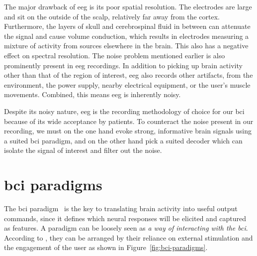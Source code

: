 The major drawback of \ac{eeg} is its poor spatial resolution.
The electrodes are large and sit on the outside of the scalp, relatively far
away from the cortex.
Furthermore, the layers of skull and cerebrospinal fluid in between can
attenuate the signal and cause volume conduction, which results in electrodes
measuring a mixture of activity from sources elsewhere in the brain.
This also has a negative effect on spectral resolution.
The noise problem mentioned earlier is also prominently present in \ac{eeg}
recordings.
In addition to picking up brain activity other than that of the region of
interest, \ac{eeg} also records other artifacts, from the environment, the power
supply, nearby electrical equipment, or the user's muscle movements.
Combined, this means \ac{eeg} is inherently noisy.

Despite its noisy nature, \ac{eeg} is the recording methodology of choice for
our \ac{bci} because of its wide acceptance by patients.
To counteract the noise present in our recording, we must on the one hand evoke
strong, informative brain signals using a suited \ac{bci} paradigm, and on the
other hand pick a suited decoder which can isolate the signal of interest and
filter out the noise.

\section{\ac{bci} paradigms}
\label{sec:bci-paradigms}

The \ac{bci} paradigm~\cite{Xu2021,Neeling2019} is the key to translating brain activity into useful
output commands, since it defines which neural responses will be elicited and
captured as features.
A paradigm can be loosely seen as \emph{a way of interacting with the
\ac{bci}}.
According to \textcite{Zander2011}, they can be arranged by their reliance on
external stimulation and the engagement of the user as shown in
Figure~\ref{fig:bci-paradigms}.

